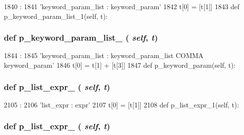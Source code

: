 \begin{DoxyCode}
1840                                        :
1841         'keyword_param_list : keyword_param'
1842         t[0] = [t[1]]
1843 
    def p_keyword_param_list_1(self, t):
\end{DoxyCode}
\hypertarget{classisa__parser_1_1ISAParser_af650b9c46d006e5ad517c7391c0e197e}{
\subsubsection[{p\_\-keyword\_\-param\_\-list\_\-1}]{\setlength{\rightskip}{0pt plus 5cm}def p\_\-keyword\_\-param\_\-list\_ ( {\em self}, \/   {\em t})}}
\label{classisa__parser_1_1ISAParser_af650b9c46d006e5ad517c7391c0e197e}



\begin{DoxyCode}
1844                                        :
1845         'keyword_param_list : keyword_param_list COMMA keyword_param'
1846         t[0] = t[1] + [t[3]]
1847 
    def p_keyword_param(self, t):
\end{DoxyCode}
\hypertarget{classisa__parser_1_1ISAParser_a37372cd33afda930a2e6d57c05668f3d}{
\subsubsection[{p\_\-list\_\-expr\_\-0}]{\setlength{\rightskip}{0pt plus 5cm}def p\_\-list\_\-expr\_ ( {\em self}, \/   {\em t})}}
\label{classisa__parser_1_1ISAParser_a37372cd33afda930a2e6d57c05668f3d}



\begin{DoxyCode}
2105                               :
2106         'list_expr : expr'
2107         t[0] = [t[1]]
2108 
    def p_list_expr_1(self, t):
\end{DoxyCode}
\hypertarget{classisa__parser_1_1ISAParser_a9372a1e9334ec79a57803a9842b9a094}{
\subsubsection[{p\_\-list\_\-expr\_\-1}]{\setlength{\rightskip}{0pt plus 5cm}def p\_\-list\_\-expr\_ ( {\em self}, \/   {\em t})}}
\label{classisa__parser_1_1ISAParser_a9372a1e9334ec79a57803a9842b9a094}



